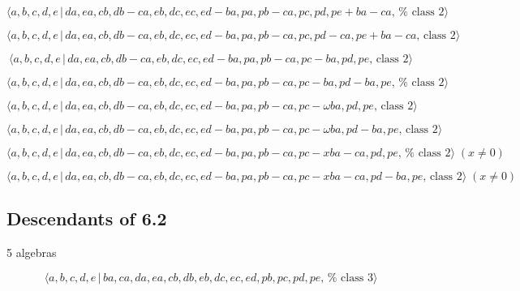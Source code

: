 \documentclass[10pt]{article}
\begin{document}
\begin{equation}
\langle
a,b,c,d,e\,|\,da,ea,cb,db-ca,eb,dc,ec,ed-ba,pa,pb-ca,pc,pd,pe+ba-ca,\,\text{%
class }2\rangle  \tag{7.4726}
\end{equation}

\begin{equation}
\langle
a,b,c,d,e\,|\,da,ea,cb,db-ca,eb,dc,ec,ed-ba,pa,pb-ca,pc,pd-ca,pe+ba-ca,\,%
\text{class }2\rangle  \tag{7.4727}
\end{equation}

\begin{equation}
\langle a,b,c,d,e\,|\,da,ea,cb,db-ca,eb,dc,ec,ed-ba,pa,pb-ca,pc-ba,pd,pe,\,%
\text{class }2\rangle  \tag{7.4728}
\end{equation}

\begin{equation}
\langle
a,b,c,d,e\,|\,da,ea,cb,db-ca,eb,dc,ec,ed-ba,pa,pb-ca,pc-ba,pd-ba,pe,\,\text{%
class }2\rangle  \tag{7.4729}
\end{equation}

\begin{equation}
\langle a,b,c,d,e\,|\,da,ea,cb,db-ca,eb,dc,ec,ed-ba,pa,pb-ca,pc-\omega
ba,pd,pe,\,\text{class }2\rangle  \tag{7.4730}
\end{equation}

\begin{equation}
\langle a,b,c,d,e\,|\,da,ea,cb,db-ca,eb,dc,ec,ed-ba,pa,pb-ca,pc-\omega
ba,pd-ba,pe,\,\text{class }2\rangle  \tag{7.4731}
\end{equation}

\begin{equation}
\langle
a,b,c,d,e\,|\,da,ea,cb,db-ca,eb,dc,ec,ed-ba,pa,pb-ca,pc-xba-ca,pd,pe,\,\text{%
class }2\rangle \;(x \neq 0)  \tag{7.4732}
\end{equation}

\begin{equation}
\langle
a,b,c,d,e\,|\,da,ea,cb,db-ca,eb,dc,ec,ed-ba,pa,pb-ca,pc-xba-ca,pd-ba,pe,\,%
\text{class }2\rangle \;(x \neq 0)  \tag{7.4733}
\end{equation}

\subsection{Descendants of 6.2}

5 algebras

\begin{equation}
\langle a,b,c,d,e\,|\,ba,ca,da,ea,cb,db,eb,dc,ec,ed,pb,pc,pd,pe,\,\text{%
class }3\rangle  \tag{7.4734}
\end{equation}
\end{document}
